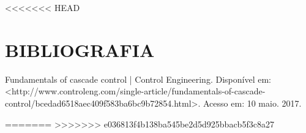\documentclass[a4paper,12pt]{article}
\begin{document}

<<<<<<< HEAD
\thispagestyle{empty}
\section{BIBLIOGRAFIA}

Fundamentals of cascade control | Control Engineering. Disponível em: <http://www.controleng.com/single-article/fundamentals-of-cascade-control/bcedad6518aec409f583ba6bc9b72854.html>. Acesso em: 10 maio. 2017.




=======
>>>>>>> e036813f4b138ba545be2d5d925bbacb5f3c8a27
%


%
\end{document}
